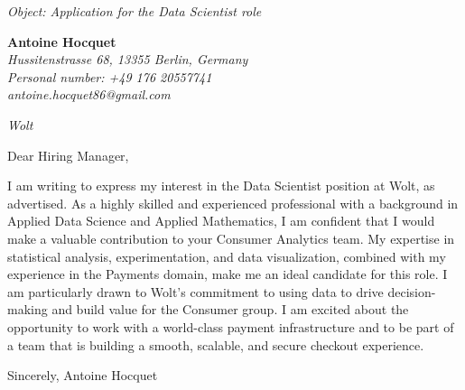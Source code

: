 \documentclass[12pt]{letter}
\begin{document}
\begin{letter}{ \itshape Object: Application for the Data Scientist role }
\hfill
\begin{flushleft}
    {\bfseries Antoine Hocquet }\\[.35ex]
    \small\itshape
    Hussitenstrasse 68, 13355 Berlin, Germany\\
    Personal number: +49 176 20557741\\
    antoine.hocquet86@gmail.com
\end{flushleft}

\hfill
\begin{flushright}
    \itshape Wolt \\
\end{flushright}

\opening{ Dear Hiring Manager, }

I am writing to express my interest in the Data Scientist position at Wolt, as advertised. As a highly skilled and experienced professional with a background in Applied Data Science and Applied Mathematics, I am confident that I would make a valuable contribution to your Consumer Analytics team. My expertise in statistical analysis, experimentation, and data visualization, combined with my experience in the Payments domain, make me an ideal candidate for this role. I am particularly drawn to Wolt's commitment to using data to drive decision-making and build value for the Consumer group. I am excited about the opportunity to work with a world-class payment infrastructure and to be part of a team that is building a smooth, scalable, and secure checkout experience.

\closing{ Sincerely, Antoine Hocquet }

\end{letter}
\end{document}
